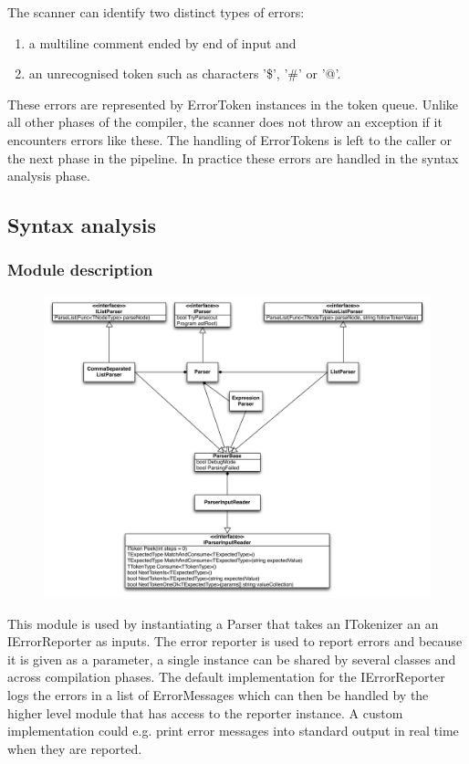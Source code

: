 \documentclass[a4paper,11pt]{article}
\begin{document}
The scanner can identify two distinct types of errors:
\begin{enumerate}
\item a multiline comment ended by end of input and
\item an unrecognised token such as characters '\$', '\#' or '@'.
\end{enumerate}

These errors are represented by ErrorToken instances in the token queue. Unlike all other phases of the compiler, the scanner does not throw an exception if it encounters errors like these. The handling of ErrorTokens is left to the caller or the next phase in the pipeline. In practice these errors are handled in the syntax analysis phase.

\subsection{Syntax analysis}

\subsubsection{Module description}

\begin{figure}[h!]
\centering
\includegraphics[width=1.0\textwidth]{syntax_analysis.pdf}
\end{figure}

This module is used by instantiating a Parser that takes an ITokenizer an an IErrorReporter as inputs. The error reporter is used to report errors and because it is given as a parameter, a single instance can be shared by several classes and across compilation phases. The default implementation for the IErrorReporter logs the errors in a list of ErrorMessages which can then be handled by the higher level module that has access to the reporter instance. A custom implementation could e.g. print error messages into standard output in real time when they are reported.
\end{document}
